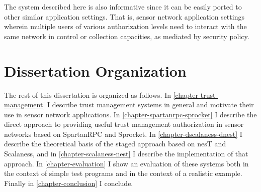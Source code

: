 The system described here is also informative since it can be easily ported to other similar
application settings. That is, sensor network application settings wherein multiple users of
various authorization levels need to interact with the same network in control or collection
capacities, as mediated by security policy.

\section{Dissertation Organization}

The rest of this dissertation is organized as follows. In \autoref{chapter-trust-management} I
describe trust management systems in general and motivate their use in sensor network
applications. In \autoref{chapter-spartanrpc-sprocket} I describe the direct approach to
providing useful trust management authorization in sensor networks based on SpartanRPC and
Sprocket. In \autoref{chapter-dscalaness-dnest} I describe the theoretical basis of the staged
approach based on nesT and Scalaness, and in \autoref{chapter-scalaness-nest} I describe the
implementation of that approach. In \autoref{chapter-evaluation} I show an evaluation of these
systems both in the context of simple test programs and in the context of a realistic example.
Finally in \autoref{chapter-conclusion} I conclude.

